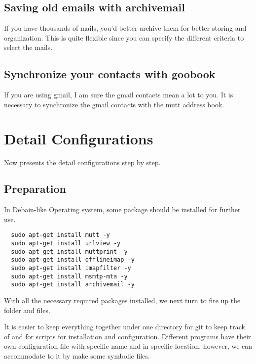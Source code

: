 \documentclass{article}
\begin{document}
\subsection{Saving old emails with archivemail}
If you have thousands of mails, you'd better archive them for better storing 
and organization. This is quite flexible since you can specify the different 
criteria to select the mails.

\subsection{Synchronize your contacts with goobook}
If you are using gmail, I am sure the gmail contacts mean a lot to you. It 
is necessary to synchronize the gmail contacts with the mutt address book.

\section{Detail Configurations}
Now presents the detail configurations step by step.

\subsection{Preparation}
In Debain-like Operating system, some package should be installed for 
further use. 

%
\begin{lstlisting}
  sudo apt-get install mutt -y
  sudo apt-get install urlview -y
  sudo apt-get install muttprint -y
  sudo apt-get install offlineimap -y
  sudo apt-get install imapfilter -y
  sudo apt-get install msmtp-mta -y
  sudo apt-get install archivemail -y
\end{lstlisting}

With all the necessary required packages installed, we next turn to fire up 
the folder and files.

It is easier to keep everything together under one directory for git to keep 
track of and for scripts for installation and configuration. Different 
programs have their own configuration file with specific name and in 
specific location, however, we can accommodate to it by make some symbolic 
files.
\end{document}
